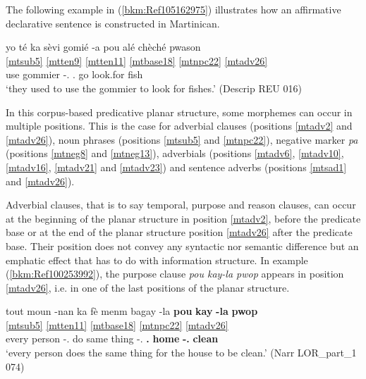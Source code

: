 \documentclass[output=paper]{langscibook}
\begin{document}

The following example in (\ref{bkm:Ref105162975}) illustrates how an affirmative declarative sentence is constructed in Martinican.

\ea\label{bkm:Ref105162975}
\glll yo té ka sèvi gomié -a pou alé chèché pwason\\
    \ref{mtsub5} \ref{mtten9} \ref{mtten11} \ref{mtbase18} \ref{mtnpc22} {} \ref{mtadv26} {} {} {} \\ 
\Third\Pl{} \Pst{} \Impf{} use gommier -\Def.\Art{} \Sub.\Purp{} go look.for fish\\
\glt `they used to use the gommier to look for fishes.' (Descrip\protect\footnotemark{} REU 016)
\z


In this corpus-based predicative planar structure, some morphemes can occur in multiple positions. This is the case for adverbial clauses (positions \ref{mtadv2} and \ref{mtadv26}), noun phrases (positions \ref{mtsub5} and \ref{mtnpc22}), negative marker \textit{pa} (positions \ref{mtneg8} and \ref{mtneg13}), adverbials (positions \ref{mtadv6}, \ref{mtadv10}, \ref{mtadv16}, \ref{mtadv21} and \ref{mtadv23}) and sentence adverbs (positions \ref{mtsad1} and \ref{mtadv26}).

\largerpage
Adverbial clauses, that is to say temporal, purpose and reason clauses, can occur at the beginning of the planar structure in position \ref{mtadv2}, before the predicate base or at the end of the planar structure position \ref{mtadv26} after the predicate base. Their position does not convey any syntactic nor semantic difference but an emphatic effect that has to do with information structure. In example (\ref{bkm:Ref100253992}), the purpose clause \textit{pou kay-la pwop} appears in position \ref{mtadv26}, i.e. in one of the last positions of the planar structure.


\ea \label{bkm:Ref100253992} 
\glll tout moun -nan ka fè menm bagay -la \textbf{pou} \textbf{kay} \textbf{-la} \textbf{pwop}\\
    \ref{mtsub5} {} {} \ref{mtten11} \ref{mtbase18} \ref{mtnpc22} {} {} \ref{mtadv26} {} {} {} \\
 every person -\Def.\Art{} \Impf{} do same thing -\Def.\Art{} \textbf{\Sub.\Purp{}} \textbf{home} \textbf{-}\textbf{\Def.\Art{}} \textbf{clean}\\
\glt `every person does the same thing for the house to be clean.' (Narr LOR\_part\_1 074)
\z
\end{document}
